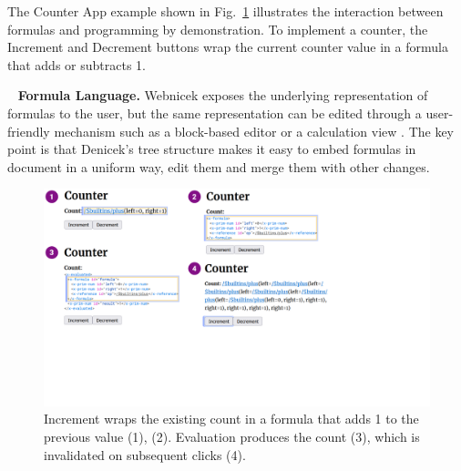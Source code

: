 \documentclass[sigconf,anonymous,screen]{acmart}
\DeclareRobustCommand{\keyideabox}[3]{\begin{tcolorbox}[breakable,
  boxsep=5pt,left=0pt,right=0pt,top=0pt,bottom=0pt,width=\dimexpr\columnwidth\relax,
  colback=gray!20,colframe=gray!20,
  enlarge bottom by=0pt,enlarge top by=0pt,
  arc=0pt,outer arc=0pt]
\lettrine[lraise=0.3]{\LARGE #1}{~}
\small \textbf{#2.} #3
\end{tcolorbox}
}
\begin{document}
The Counter App example shown in Fig.~\ref{fig:counter} illustrates the interaction between formulas
and programming by demonstration. To implement a counter, the Increment and Decrement buttons
wrap the current counter value in a formula that adds or subtracts 1.

\keyideabox{\faSuperscript}{Formula Language}{
Webnicek exposes the underlying representation of formulas to the user, but the same representation
can be edited through a user-friendly mechanism such as a block-based editor
\cite{jansen-2019-xlblocks} or a calculation view \cite{sarkar-2018-calc}. The key point
is that Denicek's tree structure makes it easy to embed formulas in document in a uniform
way, edit them and merge them with other changes.}


\begin{figure}[t]
\vspace{-0.5em}
\includegraphics[width=0.95\columnwidth,clip,trim=0cm 7cm 8cm 0cm]{fig/counter.pdf}
\vspace{-0.5em}
\caption{Increment wraps the existing count in a formula that adds 1 to the
previous value (1), (2). Evaluation produces the count (3), which is invalidated on subsequent clicks (4).}
\label{fig:counter}
\vspace{-1em}
\end{figure}

\end{document}
